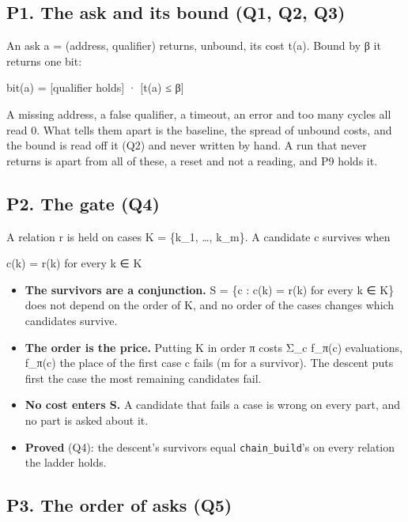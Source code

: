 \subsection{\texorpdfstring{P1. The ask and its bound (Q1, Q2, Q3)}{P1. The ask and its bound (Q1, Q2, Q3)}}

An ask a = (address, qualifier) returns, unbound, its cost t(a). Bound by β it returns one bit:

bit(a) = [qualifier holds] · [t(a) ≤ β]

A missing address, a false qualifier, a timeout, an error and too many cycles all read 0. What tells them apart is the baseline, the spread of unbound costs, and the bound is read off it (Q2) and never written by hand. A run that never returns is apart from all of these, a reset and not a reading, and P9 holds it.

\subsection{\texorpdfstring{P2. The gate (Q4)}{P2. The gate (Q4)}}

A relation r is held on cases K = \{k\_\allowbreak{}1, …, k\_\allowbreak{}m\}. A candidate c survives when

c(k) = r(k) for every k ∈ K

\begin{itemize}
\item \textbf{The survivors are a conjunction.} S = \{c : c(k) = r(k) for every k ∈ K\} does not depend on the order of K, and no order of the cases changes which candidates survive.
\item \textbf{The order is the price.} Putting K in order π costs Σ\_\allowbreak{}c f\_\allowbreak{}π(c) evaluations, f\_\allowbreak{}π(c) the place of the first case c fails (m for a survivor). The descent puts first the case the most remaining candidates fail.
\item \textbf{No cost enters S.} A candidate that fails a case is wrong on every part, and no part is asked about it.
\item \textbf{Proved} (Q4): the descent's survivors equal \texttt{chain\_\allowbreak{}build}'s on every relation the ladder holds.
\end{itemize}

\subsection{\texorpdfstring{P3. The order of asks (Q5)}{P3. The order of asks (Q5)}}


